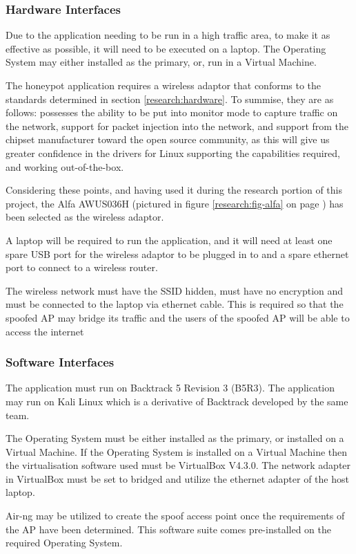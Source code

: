 \subsubsection{Hardware Interfaces}
Due to the application needing to be run in a high traffic area, to make it as effective as possible, it will need to be executed on a laptop. The Operating System may either installed as the primary, or, run in a Virtual Machine.

The honeypot application requires a wireless adaptor that conforms to the standards determined in section \ref{research:hardware}. To summise, they are as follows: possesses the ability to be put into monitor mode to capture traffic on the network, support for packet injection into the network, and support from the chipset manufacturer toward the open source community, as this will give us greater confidence in the drivers for Linux supporting the capabilities required, and working out-of-the-box.

Considering these points, and having used it during the research portion of this project, the Alfa AWUS036H (pictured in figure \ref{research:fig-alfa} on page \pageref{research:fig-alfa}) has been selected as the wireless adaptor.

A laptop will be required to run the application, and it will need at least one spare USB port for the wireless adaptor to be plugged in to and a spare ethernet port to connect to a wireless router.

The wireless network must have the SSID hidden, must have no encryption and must be connected to the laptop via ethernet cable. This is required so that the spoofed AP may bridge its traffic and the users of the spoofed AP will be able to access the internet

\subsubsection{Software Interfaces}
The application must run on Backtrack 5 Revision 3 (B5R3). The application may run on Kali Linux which is a derivative of Backtrack developed by the same team.

The Operating System must be either installed as the primary, or installed on a Virtual Machine. If the Operating System is installed on a Virtual Machine then the virtualisation software used must be VirtualBox V4.3.0. The network adapter in VirtualBox must be set to bridged and utilize the ethernet adapter of the host laptop.

Air-ng may be utilized to create the spoof access point once the requirements of the AP have been determined. This software suite comes pre-installed on the required Operating System. 

